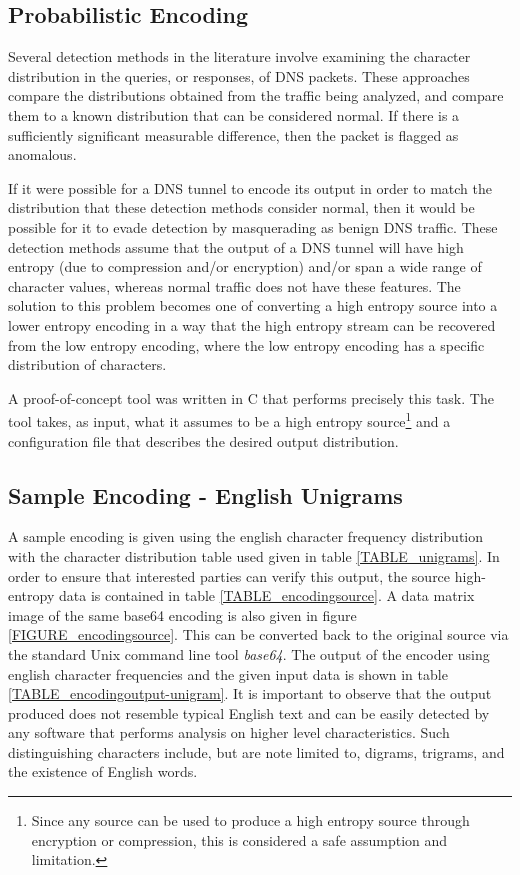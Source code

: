 \documentclass[12pt]{report}
\theoremstyle{remark}
\theoremstyle{definition}
\theoremstyle{definition}
\theoremstyle{definition}
\begin{document}
\begin{appendices}
\chapter{Probabilistic Encoding}
\label{appendix-probcode}
Several detection methods in
the literature involve examining the character distribution in the queries, or
responses, of DNS packets. These approaches compare the distributions obtained
from the traffic being analyzed, and compare them to a known distribution that
can be considered normal. If there is a sufficiently significant measurable
difference, then the packet is flagged as anomalous.

If it were possible for a DNS tunnel to encode its output in order to match the
distribution that these detection methods consider normal, then it would be
possible for it to evade detection by masquerading as benign DNS traffic. These
detection methods assume that the output of a DNS tunnel will have high entropy
(due to compression and/or encryption) and/or span a wide range of character
values, whereas normal traffic does not have these features. The solution to
this problem becomes one of converting a high entropy source into a lower entropy
encoding in a way that the high entropy stream can be recovered from the low
entropy encoding, where the low entropy encoding has a specific distribution of
characters.

A proof-of-concept tool was written in C that performs precisely this task. The
tool takes, as input, what it assumes to be a high entropy source\footnote{Since
any source can be used to produce a high entropy source through encryption or
compression, this is considered a safe assumption and limitation.} and a
configuration file that describes the desired output distribution.

\section{Sample Encoding - English Unigrams}

A sample encoding is given using the english character
frequency distribution with the character distribution table used given in table
\ref{TABLE_unigrams}. In order to ensure that interested parties can verify this
output, the source high-entropy data is contained in table
\ref{TABLE_encodingsource}. A data matrix image of the same base64 encoding is
also given in figure \ref{FIGURE_encodingsource}. This can be converted back to
the original source via the standard Unix command line tool \emph{base64}. The
output of the encoder using english character frequencies and the given input
data is shown in table \ref{TABLE_encodingoutput-unigram}. It is important to observe
that the output produced does not resemble typical English text and can be easily
detected by any software that performs analysis on higher level characteristics.
Such distinguishing characters include, but are note limited to, digrams, trigrams,
and the existence of English words.


\end{appendices}
\end{document}
